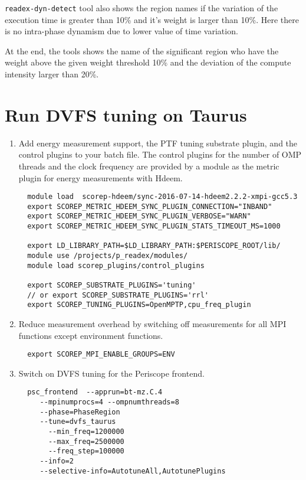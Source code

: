 \documentclass[12pt]{article}
\begin{document}
\texttt{readex-dyn-detect} tool also shows the region names if the variation of the execution time is greater than 10\% and it's weight is larger than 10\%. Here there is no intra-phase dynamism due to lower value of time variation.

At the end, the tools shows the name of the significant region who have the weight above the given weight threshold 10\% and the deviation of the compute intensity  larger than 20\%.


\section{Run DVFS tuning on Taurus}

\begin{enumerate}
  \item Add energy measurement support, the PTF tuning substrate plugin, and the control plugins to your batch file. The control plugins for the number of OMP threads and the clock frequency are provided by a module as the metric plugin for energy measurements with Hdeem.
  \begin{verbatim}
  module load  scorep-hdeem/sync-2016-07-14-hdeem2.2.2-xmpi-gcc5.3
  export SCOREP_METRIC_HDEEM_SYNC_PLUGIN_CONNECTION="INBAND"
  export SCOREP_METRIC_HDEEM_SYNC_PLUGIN_VERBOSE="WARN"
  export SCOREP_METRIC_HDEEM_SYNC_PLUGIN_STATS_TIMEOUT_MS=1000

  export LD_LIBRARY_PATH=$LD_LIBRARY_PATH:$PERISCOPE_ROOT/lib/
  module use /projects/p_readex/modules/
  module load scorep_plugins/control_plugins

  export SCOREP_SUBSTRATE_PLUGINS='tuning'
  // or export SCOREP_SUBSTRATE_PLUGINS='rrl'
  export SCOREP_TUNING_PLUGINS=OpenMPTP,cpu_freq_plugin
  \end{verbatim}

  \item Reduce measurement overhead by switching off measurements for all MPI functions except environment functions.
  \begin{verbatim}
  export SCOREP_MPI_ENABLE_GROUPS=ENV
  \end{verbatim}
  \item Switch on DVFS tuning for the Periscope frontend.
  \begin{verbatim}
  psc_frontend  --apprun=bt-mz.C.4
     --mpinumprocs=4 --ompnumthreads=8
     --phase=PhaseRegion
     --tune=dvfs_taurus
       --min_freq=1200000
       --max_freq=2500000
       --freq_step=100000
     --info=2
     --selective-info=AutotuneAll,AutotunePlugins
  \end{verbatim}
\end{enumerate}
\end{document}
